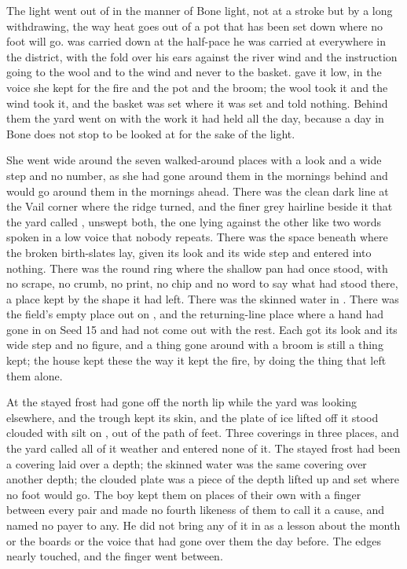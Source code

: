 The light went out of  in the manner of Bone light, not at a stroke but by a long withdrawing, the way heat goes out of a pot that has been set down where no foot will go.  was carried down at the half-pace he was carried at everywhere in the district, with the fold over his ears against the river wind and the instruction going to the wool and to the wind and never to the basket.  gave it low, in the voice she kept for the fire and the pot and the broom; the wool took it and the wind took it, and the basket was set where it was set and told nothing. Behind them the yard went on with the work it had held all the day, because a day in Bone does not stop to be looked at for the sake of the light.

She went wide around the seven walked-around places with a look and a wide step and no number, as she had gone around them in the mornings behind and would go around them in the mornings ahead. There was the clean dark line at the Vail corner where the  ridge turned, and the finer grey hairline beside it that the yard called , unswept both, the one lying against the other like two words spoken in a low voice that nobody repeats. There was the space beneath  where the broken birth-slates lay, given its look and its wide step and entered into nothing. There was the round ring where the shallow pan had once stood, with no scrape, no crumb, no print, no chip and no word to say what had stood there, a place kept by the shape it had left. There was the skinned water in . There was the field's empty place out on , and the returning-line place where a hand had gone in on Seed 15 and had not come out with the rest. Each got its look and its wide step and no figure, and a thing gone around with a broom is still a thing kept; the house kept these the way it kept the fire, by doing the thing that left them alone.

At  the stayed frost had gone off the north lip while the yard was looking elsewhere, and the trough kept its skin, and the plate of ice lifted off it stood clouded with silt on , out of the path of feet. Three coverings in three places, and the yard called all of it weather and entered none of it. The stayed frost had been a covering laid over a depth; the skinned water was the same covering over another depth; the clouded plate was a piece of the depth lifted up and set where no foot would go. The boy kept them on places of their own with a finger between every pair and made no fourth likeness of them to call it a cause, and named no payer to any. He did not bring any of it in as a lesson about the month or the boards or the voice that had gone over them the day before. The edges nearly touched, and the finger went between.

